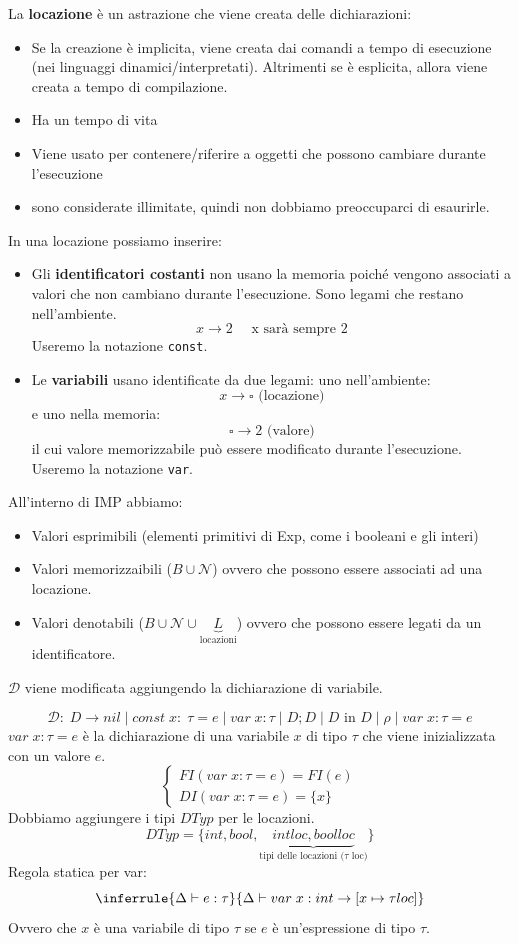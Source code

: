 \documentclass[a4paper]{article}
\begin{document}
{
  La \textbf{locazione} è un astrazione che viene creata delle dichiarazioni:
  \begin{itemize}
    \item Se la creazione è implicita, viene creata dai comandi a tempo di esecuzione 
    (nei linguaggi dinamici/interpretati). Altrimenti se è esplicita, 
    allora viene creata a tempo di compilazione.
    \item Ha un tempo di vita 
    \item Viene usato per contenere/riferire a oggetti che possono cambiare durante
    l'esecuzione 
    \item sono considerate illimitate, quindi non dobbiamo 
    preoccuparci di esaurirle.
  \end{itemize}
}
\noindent
In una locazione possiamo inserire:
\begin{itemize}
  \item Gli \textbf{identificatori costanti} non usano la memoria poiché vengono associati 
  a valori che non cambiano durante l'esecuzione. Sono legami che 
  restano nell'ambiente. 
  \[x \to 2 \quad \text{ x sarà sempre 2}\]
  Useremo la notazione \texttt{const}.
  \item Le \textbf{variabili} usano identificate da due legami: uno nell'ambiente:
  \[
    x \to \square \text{ (locazione)}
  \]
  e uno nella memoria:
  \[
    \square \to 2 \text{ (valore)}
  \]
  il cui valore memorizzabile può essere modificato durante l'esecuzione.
  Useremo la notazione \texttt{var}.
\end{itemize}
All'interno di IMP abbiamo:
\begin{itemize}
  \item Valori esprimibili (elementi primitivi di Exp, come i booleani e gli interi)
  \item Valori memorizzaibili ($B \cup \mathcal{N}$) ovvero che possono essere associati ad una locazione.
  \item Valori denotabili ($B \cup \mathcal{N} \cup \underbrace{L}_{\text{locazioni}}$) ovvero che possono 
  essere legati da un identificatore.
\end{itemize}
$\mathcal{D}$ viene modificata aggiungendo la dichiarazione di variabile. 

\[
  \mathcal{D}: \; D \to nil \; | \; const\; x : \; \tau = e \; | \; var \; x : \tau \; | \;  D ; D \; | \;  D \text{ in } D \; | \; \rho \; |  \; var \; x : \tau = e 
\]
$var \; x : \tau = e$ è la dichiarazione di una variabile $x$ di tipo $\tau$ che viene inizializzata con un valore $e$. 
\[
\begin{cases}
  FI(var \; x : \tau = e) = FI(e)\\
  DI(var \; x : \tau = e) = \{x\}
\end{cases}
\]
Dobbiamo aggiungere i tipi $DTyp$ per le locazioni. 
\[
  DTyp = \{int, bool, \underbrace{intloc, boolloc}_{\text{tipi delle locazioni ($\tau$ loc)}}\}
\]
Regola statica per var:
\[
  \inferrule
  {\Delta \vdash e : \tau}
  {\Delta \vdash var \; x : int \to [x \mapsto \tau loc]}
\]
Ovvero che $x$ è una variabile di tipo $\tau$ se $e$ è un'espressione di tipo $\tau$.
\end{document}
